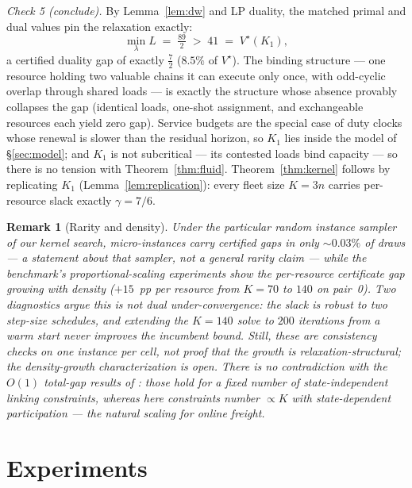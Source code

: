 \documentclass[11pt]{article}
\newtheorem{remark}{Remark}
\newcommand{\Vstar}{V^{\star}}
\begin{document}
\emph{Check 5 (conclude).} By Lemma~\ref{lem:dw} and LP duality, the
matched primal and dual values pin the relaxation exactly:
\[
  \min_{\lambda} L \;=\; \tfrac{89}{2} \;>\; 41 \;=\; \Vstar(K_1),
\]
a certified duality gap of exactly $\tfrac{7}{2}$ ($8.5\%$ of
$\Vstar$). The binding structure ---
one resource holding two valuable chains it can execute only once, with
odd-cyclic overlap through shared loads --- is exactly the structure
whose absence provably collapses the gap (identical loads, one-shot
assignment, and exchangeable resources each yield zero gap).
Service budgets are the special case of duty clocks whose renewal is
slower than the residual horizon, so $K_1$ lies inside the model of
\S\ref{sec:model}; and $K_1$ is not subcritical --- its contested loads
bind capacity --- so there is no tension with
Theorem~\ref{thm:fluid}. Theorem~\ref{thm:kernel} follows by
replicating $K_1$ (Lemma~\ref{lem:replication}): every fleet size
$K = 3n$ carries per-resource slack exactly $\gamma = 7/6$.

\begin{remark}[Rarity and density]
Under the particular random instance sampler of our kernel search,
micro-instances carry certified gaps in only ${\sim}0.03\%$ of draws
--- a statement about that sampler, not a general rarity claim ---
while the benchmark's proportional-scaling experiments show the
per-resource certificate gap growing with density ($+15$~pp per
resource from $K = 70$ to $140$ on pair~0). Two diagnostics argue this is not dual under-convergence: the
slack is robust to two step-size schedules, and extending the $K=140$
solve to $200$ iterations from a warm start never improves the
incumbent bound. Still, these are consistency checks on one instance
per cell, not proof that the growth is relaxation-structural; the
density-growth characterization is open. There is no contradiction with the $O(1)$ total-gap results of
\citet{brownzhang2023strength}: those hold for a fixed number of
state-independent linking constraints, whereas here constraints number
$\propto K$ with state-dependent participation --- the natural scaling
for online freight.
\end{remark}

\section{Experiments}
\label{sec:experiments}
\end{document}
